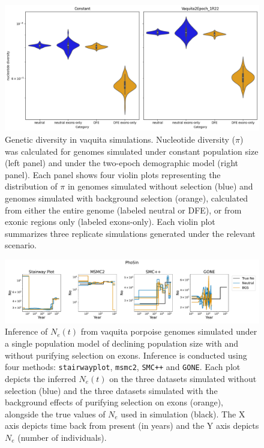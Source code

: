 \documentclass[hidelinks]{article}
\newcommand{\msmc}{\texttt{msmc2}\xspace}
\newcommand{\stairway}{\texttt{stairwayplot}\xspace}
\newcommand{\gone}{\texttt{GONE}\xspace}
\newcommand{\smcpp}{\texttt{SMC++}\xspace}
\begin{document}
\begin{figure}[h]
    \centering
    \includegraphics[width=\textwidth]{figures/PhoSin/summary_stats.png}
    \caption{
    \label{fig:vaquita-summary-stats}
    Genetic diversity in vaquita simulations.
    Nucleotide diversity ($\pi$) was calculated for genomes simulated
    under constant population size (left panel) and under the two-epoch demographic model (right panel).
    Each panel shows four violin plots representing the distribution of $\pi$
    in genomes simulated without selection (blue) and genomes simulated with background selection (orange),
    calculated from either the entire genome (labeled neutral or DFE),
    or from exonic regions only (labeled exons-only).
    Each violin plot summarizes three replicate simulations generated under the relevant scenario.
     }
\end{figure}

\begin{figure}[h]
    \centering
    \includegraphics[width=\textwidth]{figures/PhoSin/Vaquita2Epoch_1R22/estimated_Ne_t_final.pdf}
    \caption{
    \label{fig:vaquita-demography}
    Inference of $N_e(t)$ from vaquita porpoise genomes simulated under a single population
    model of declining population size with and without purifying selection on exons.
    Inference is conducted using four methods: \stairway, \msmc, \smcpp and \gone.
    Each plot depicts the inferred $N_e(t)$ on the three datasets simulated without selection (blue)
    and the three datasets simulated with the background effects of purifying selection on exons (orange),
    alongside the true values of $N_e$ used in simulation (black).
    The X axis depicts time back from present (in years) and the Y axis depicts $N_e$ (number of individuals).
}
\end{figure}
\end{document}
